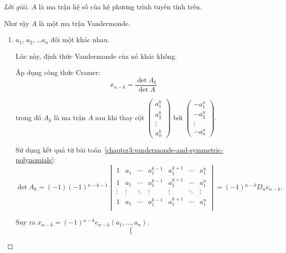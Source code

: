 \documentclass[class=nhvh-linear-algebra,crop=false]{standalone}
\begin{document}
\begin{proof}[Lời giải]
    \par $A$ là ma trận hệ số của hệ phương trình tuyến tính trên.
    \par Như vậy $A$ là một ma trận Vandermonde.

    \begin{enumerate}[label = \textbf{Trường hợp \arabic*.},itemindent=2cm]
        \item $a_{1}$, $a_{2}$, \ldots $a_{n}$ đôi một khác nhau.
              \par Lúc này, định thức Vandermonde của nó khác không.
              \par Áp dụng công thức Cramer:
              \[
                  x_{n-k} = \dfrac{\det A_{k}}{\det A}
              \]
              \par trong đó $A_{k}$ là ma trận $A$ sau khi thay cột $\begin{pmatrix} a_{1}^{k} \\ a_{2}^{k} \\ \vdots \\ a_{n}^{k} \end{pmatrix}$ bởi $\begin{pmatrix}-a_{1}^{n} \\ -a_{2}^{n} \\ \vdots \\ -a_{n}^{n} \end{pmatrix}$.
              \par Sử dụng kết quả từ bài toán~\ref{chapter3:vandermonde-and-symmetric-polynomials}:
              \[
                  \det A_{k} = (-1)(-1){}^{n-k-1}
                  \begin{vmatrix}
                      1      & a_{1}  & \cdots & a_{1}^{k-1} & a_{1}^{k+1} & \cdots & a_{1}^{n} \\
                      1      & a_{1}  & \cdots & a_{1}^{k-1} & a_{1}^{k+1} & \cdots & a_{1}^{n} \\
                      \vdots & \vdots & \ddots & \vdots      & \vdots      & \ddots & \vdots    \\
                      1      & a_{1}  & \cdots & a_{1}^{k-1} & a_{1}^{k+1} & \cdots & a_{1}^{n} \\
                  \end{vmatrix}
                  = (-1){}^{n-k}D_{n}e_{n-k}.
              \]
              \par Suy ra $x_{n-k} = (-1){}^{n-k}e_{n-k}(a_{1},\ldots, a_{n})$.
              \[
                  \begin{cases}

\end{cases}\]
\end{enumerate}
\end{proof}
\end{document}
